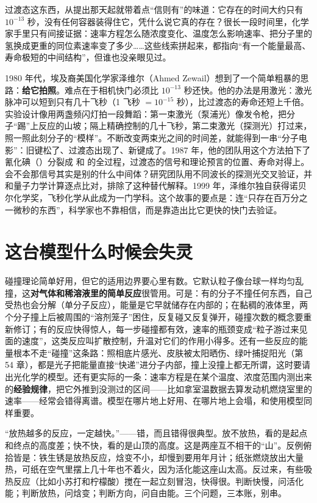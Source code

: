 \begin{zhengju}
过渡态这东西，从提出那天起就带着点“信则有”的味道：它存在的时间大约只有 $10^{-13}$ 秒，没有任何容器装得住它，凭什么说它真的存在？很长一段时间里，化学家手里只有间接证据：速率方程怎么随浓度变化、温度怎么影响速率、把分子里的氢换成更重的同位素速率变了多少……这些线索拼起来，都指向“有一个能量最高、寿命极短的中间结构”，但谁也没亲眼见过。

1980 年代，埃及裔美国化学家泽维尔（Ahmed Zewail）想到了一个简单粗暴的思路：\textbf{给它拍照}。难点在于相机快门必须比 $10^{-13}$ 秒还快。他的办法是用激光：激光脉冲可以短到只有几十飞秒（1 飞秒 $= 10^{-15}$ 秒），比过渡态的寿命还短上千倍。实验设计像用两盏频闪灯拍一段舞蹈：第一束激光（泵浦光）像发令枪，把分子“踢”上反应的山坡；隔上精确控制的几十飞秒，第二束激光（探测光）打过来，照一照此刻分子的“模样”。不断改变两束光之间的时间差，就能得到一串“分子电影”：旧键松了、过渡态出现了、新键成了。1987 年，他的团队用这个方法拍下了氰化碘（）分裂成  和  的全过程，过渡态的信号和理论预言的位置、寿命对得上。会不会那信号其实是别的什么中间体？研究团队用不同波长的探测光交叉验证，并和量子力学计算逐点比对，排除了这种替代解释。1999 年，泽维尔独自获得诺贝尔化学奖，飞秒化学从此成为一门学科。这个故事的要点是：连“只存在百万分之一微秒的东西”，科学家也不靠相信，而是靠造出比它更快的快门去验证。
\end{zhengju}

\section{这台模型什么时候会失灵}

碰撞理论简单好用，但它的适用边界要心里有数。它默认粒子像台球一样均匀乱撞，这\textbf{对气体和稀溶液里的简单反应}很管用。可是：有的分子不撞任何东西，自己受热也会分解（单分子反应），能量是它早就储存在内部的；在黏稠的液体里，两个分子撞上后被周围的“溶剂笼子”困住，反复碰又反复弹开，碰撞次数的概念要重新修订；有的反应快得惊人，每一步碰撞都有效，速率的瓶颈变成“粒子游过来见面的速度”，这类反应叫扩散控制，升温对它们的作用小得多。还有一些反应的能量根本不走“碰撞”这条路：照相底片感光、皮肤被太阳晒伤、绿叶捕捉阳光（第 54 章），都是光子把能量直接“快递”进分子内部，撞上没撞上都无所谓，这时要请出光化学的模型。还有更实际的一条：速率方程是在某个温度、浓度范围内测出来的\textbf{经验规律}，把它外推到没测过的区间——比如拿室温数据去算发动机燃烧室里的速率——经常会错得离谱。模型在哪片地上好用、在哪片地上会塌，和使用模型同样重要。

\begin{wuqu}
“放热越多的反应，一定越快。”——错，而且错得很典型。放不放热，看的是起点和终点的高度差；快不快，看的是山顶的高度。这是两座互不相干的“山”。反例俯拾皆是：铁生锈是放热反应，焓变不小，却慢到要用年月计；纸张燃烧放出大量热，可纸在空气里摆上几十年也不着火，因为活化能这座山太高。反过来，有些吸热反应（比如小苏打和柠檬酸）搅在一起立刻冒泡，快得很。判断快慢，问活化能；判断放热，问焓变；判断方向，问自由能。三个问题，三本账，别串。
\end{wuqu}

